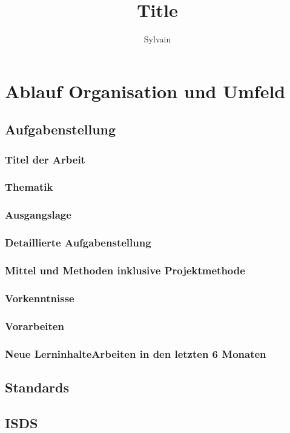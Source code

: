 \documentclass{report}
\title{Title}
\author{Sylvain}
\begin{document}
\maketitle

\tableofcontents

\part{Ablauf Organisation und Umfeld}

\chapter{Aufgabenstellung}
\section{Titel der Arbeit}
\section{Thematik}
\section{Ausgangslage}
\section{Detaillierte Aufgabenstellung}
\section{Mittel und Methoden inklusive Projektmethode}
\section{Vorkenntnisse}
\section{Vorarbeiten}
\section{Neue LerninhalteArbeiten in den letzten 6 Monaten}


\chapter{Standards}

\chapter{ISDS}
\end{document}
